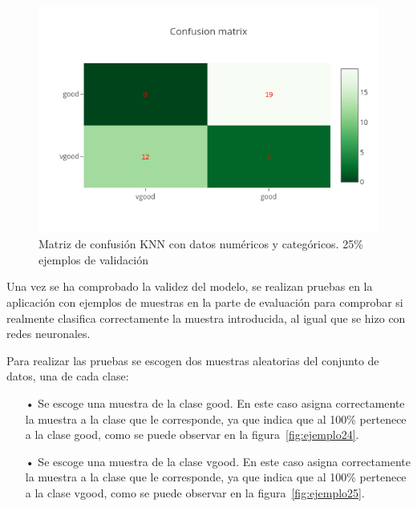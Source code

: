 \documentclass[a4paper, 12pt]{book}
\begin{document}
\begin{figure}
	\centering
	\includegraphics[width=12cm, keepaspectratio]{img/cm_numycat_knn.png}
	\caption{Matriz de confusión KNN con datos numéricos y categóricos. 25\% ejemplos de validación} 	
	\label{fig:ejemplo23}
\end{figure}

Una vez se ha comprobado la validez del modelo, se realizan pruebas en la aplicación con ejemplos de muestras en la parte de evaluación para comprobar si realmente clasifica correctamente la muestra introducida, al igual que se hizo con redes neuronales.

Para realizar las pruebas se escogen dos muestras aleatorias del conjunto de datos, una de cada clase:

\begin{itemize}
\item[•] Se escoge una muestra de la clase good. En este caso asigna correctamente la muestra a la clase que le corresponde, ya que indica que al 100\% pertenece a la clase good, como se puede observar en la figura~\ref{fig:ejemplo24}.
\item[•] Se escoge una muestra de la clase vgood. En este caso asigna correctamente la muestra a la clase que le corresponde, ya que indica que al 100\% pertenece a la clase vgood, como se puede observar en la figura~\ref{fig:ejemplo25}.
\end{itemize}
\end{document}
